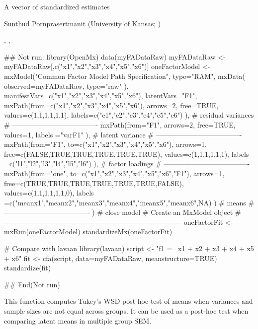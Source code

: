 \documentclass[a4paper]{book}
\begin{document}
%
\begin{Value}
A vector of standardized estimates
\end{Value}
%
\begin{Author}\relax
Sunthud Pornprasertmanit (University of Kansas; )
\end{Author}
%
\begin{SeeAlso}\relax
{}, , 
\end{SeeAlso}
%
\begin{Examples}
\begin{ExampleCode}
## Not run: 
library(OpenMx)
data(myFADataRaw)
myFADataRaw <- myFADataRaw[,c("x1","x2","x3","x4","x5","x6")]
oneFactorModel <- mxModel("Common Factor Model Path Specification", 
	type="RAM",
	mxData(
		observed=myFADataRaw, 
		type="raw"
	),
	manifestVars=c("x1","x2","x3","x4","x5","x6"),
	latentVars="F1",
	mxPath(from=c("x1","x2","x3","x4","x5","x6"),
		arrows=2,
		free=TRUE,
		values=c(1,1,1,1,1,1),
		labels=c("e1","e2","e3","e4","e5","e6")
	), 
	# residual variances
	# -------------------------------------
	mxPath(from="F1",
		arrows=2,
		free=TRUE,
		values=1,
		labels ="varF1"
	), 
	# latent variance
	# -------------------------------------
	mxPath(from="F1",
		to=c("x1","x2","x3","x4","x5","x6"),
		arrows=1,
		free=c(FALSE,TRUE,TRUE,TRUE,TRUE,TRUE),
		values=c(1,1,1,1,1,1),
		labels =c("l1","l2","l3","l4","l5","l6")
	), 
	# factor loadings
	# -------------------------------------
	mxPath(from="one",
		to=c("x1","x2","x3","x4","x5","x6","F1"),
		arrows=1,
		free=c(TRUE,TRUE,TRUE,TRUE,TRUE,TRUE,FALSE),
		values=c(1,1,1,1,1,1,0),
		labels =c("meanx1","meanx2","meanx3","meanx4","meanx5","meanx6",NA)
	) 
	# means
	# -------------------------------------
) # close model
# Create an MxModel object
# -----------------------------------------------------------------------------
oneFactorFit <- mxRun(oneFactorModel)      
standardizeMx(oneFactorFit)

# Compare with lavaan
library(lavaan)
script <- "f1 =~ x1 + x2 + x3 + x4 + x5 + x6"
fit <- cfa(script, data=myFADataRaw, meanstructure=TRUE)
standardize(fit)

## End(Not run)
\end{ExampleCode}
\end{Examples}
%
\begin{Description}\relax
This function computes Tukey's WSD post-hoc test of means when variances and sample sizes are not equal across groups. It can be used as a post-hoc test when comparing latent means in multiple group SEM.
\end{Description}
\end{document}
